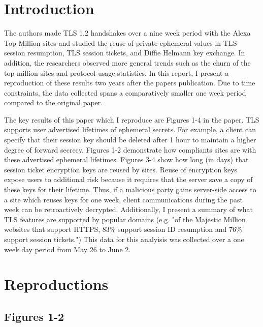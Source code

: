 \section{Introduction}

The authors made TLS 1.2 handshakes over a nine week period with the Alexa Top Million sites and studied the reuse of private ephemeral values in TLS session resumption, TLS session tickets, and Diffie Helmann key exchange. In addition, the researchers observed more general trends such as the churn of the top million sites and protocol usage statistics. In this report, I present a reproduction of these results two years after the papers publication. Due to time constraints, the data collected spans a comparatively smaller one week period compared to the original paper.

The key results of this paper which I reproduce are Figures 1-4 in the paper. TLS supports user advertised lifetimes of ephemeral secrets. For example, a client can specify that their session key should be deleted after 1 hour to maintain a higher degree of forward secrecy. Figures 1-2 demonstrate how compliants sites are with these advertised ephemeral lifetimes. Figures 3-4 show how long (in days) that session ticket encryption keys are reused by sites. Reuse of encryption keys expose users to additional risk because it requires that the server save a copy of these keys for their lifetime. Thus, if a malicious party gains server-side access to a site which reuses keys for one week, client communications during the past week can be retroactively decrypted. Additionally, I present a summary of what TLS features are supported by popular domains (e.g. "of the Majestic Million websites that support HTTPS, 83\% support session ID resumption and 76\% support session tickets.") This data for this analyisis was collected over a one week day period from May 26 to June 2.



\section{Reproductions}

\subsection{Figures 1-2}


